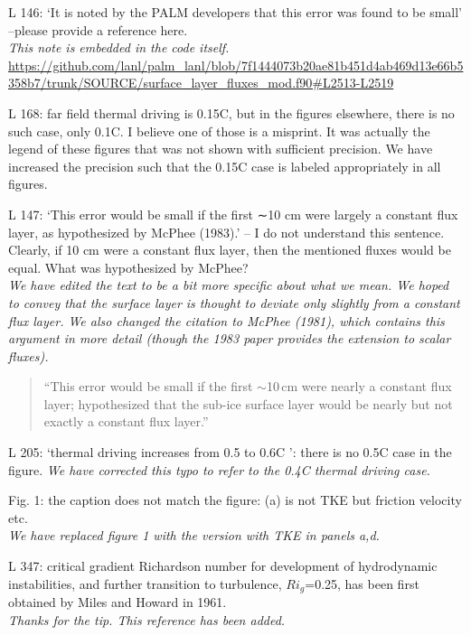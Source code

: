 \documentclass[tc, manuscript]{copernicus}
\begin{document}
L 146: ‘It is noted by the PALM developers that this error was found to be small’ –please provide a reference here.\\
\textit{This note is embedded in the code itself.}
\url{https://github.com/lanl/palm_lanl/blob/7f1444073b20ae81b451d4ab469d13e66b5358b7/trunk/SOURCE/surface_layer_fluxes_mod.f90#L2513-L2519}\vspace{12pt}

L 168: far field thermal driving is 0.15C, but in the figures elsewhere, there is no such case, only 0.1C. I believe one of those is a misprint.
It was actually the legend of these figures that was not shown with sufficient precision. We have increased the precision such that the 0.15C case is labeled appropriately in all figures.
\vspace{12pt}

L 147: ‘This error would be small if the first ∼10 cm were largely a constant flux layer, as hypothesized by McPhee (1983).’ – I do not understand this sentence. Clearly, if 10 cm were a constant flux layer, then the mentioned fluxes would be equal. What was hypothesized by McPhee?\\
\textit{We have edited the text to be a bit more specific about what we mean. We hoped to convey that the surface layer is thought to deviate only slightly from a constant flux layer. We also changed the citation to McPhee (1981), which contains this argument in more detail (though the 1983 paper provides the extension to scalar fluxes).}
\begin{quote}
``This error would be small if the first $\sim$10\,\unit{cm} were nearly a constant flux layer; \citet{mcphee_analytic_1981} hypothesized that the sub-ice surface layer would be nearly but not exactly a constant flux layer.''
\end{quote}\vspace{12pt}

L 205: ‘thermal driving increases from 0.5 to 0.6C ’: there is no 0.5C case in the figure.
\textit{We have corrected this typo to refer to the 0.4C thermal driving case.}
\vspace{12pt}

Fig. 1: the caption does not match the figure: (a) is not TKE but friction velocity etc.\\
\textit{We have replaced figure 1 with the version with TKE in panels a,d.}\vspace{12pt}

L 347: critical gradient Richardson number for development of hydrodynamic instabilities, and further transition to turbulence, $Ri_g$=0.25, has been first obtained by Miles and Howard in 1961.\\
\textit{Thanks for the tip. This reference has been added.}\vspace{12pt}
\end{document}
